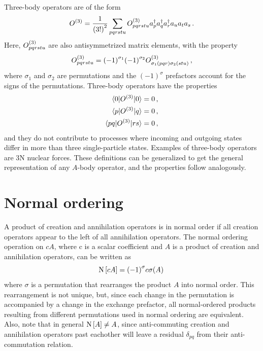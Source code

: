 Three-body operators are of the form
\begin{equation}\label{eq:threebody_op_definition}
  {O}^{(3)} = \frac{1}{{(3!)}^2} \sum_{pqrstu} {O}^{(3)}_{pqrstu} a_{p}^{\dagger} a_{q}^{\dagger} a_{r}^{\dagger} a_{u} a_{t} a_{s}\,.
\end{equation}
Here, ${O}^{(3)}_{pqrstu}$ are also antisymmetrized matrix elements, with the property
\begin{equation}
  {O}^{(3)}_{pqrstu} = {(-1)}^{\sigma_1}{(-1)}^{\sigma_2}{O}^{(3)}_{\sigma_1(pqr)\sigma_2(stu)}\,,
\end{equation}
where $\sigma_1$ and $\sigma_2$ are permutations
and the ${(-1)}^{\sigma}$ prefactors account for the signs of the permutations.
Three-body operators have the properties
\begin{align}
  \braket{0 | {O}^{(3)} | 0} & = 0\,,\\
  \braket{p | {O}^{(3)} | q} & = 0\,, \\
  \braket{p q| {O}^{(3)} |r s} & = 0\,,
\end{align}
and they do not contribute to processes where incoming and outgoing states
differ in more than three single-particle states.
Examples of three-body operators are 3N nuclear forces.
These definitions can be generalized to get the general representation of any $A$-body operator,
and the properties follow analogously.

\section{Normal ordering}

A product of creation and annihilation operators is in normal order
if all creation operators appear to the left of all annihilation operators.
The normal ordering operation on $c A$,
where c is a scalar coefficient and $A$ is a product of creation and annihilation operators,
can be written as
\begin{equation}
  \text{N}\left[c A\right] = {(-1)}^{\sigma} c \sigma(A)\,
\end{equation}
where $\sigma$ is a permutation that rearranges the product $A$ into normal order.
This rearrangement is not unique,
but, since each change in the permutation is accompanied by a change in the exchange prefactor,
all normal-ordered products resulting from different permutations used in normal ordering
are equivalent.
Also, note that in general $\text{N}\left[A\right] \neq A$,
since anti-commuting creation and annihilation operators past eachother
will leave a residual $\delta_{pq}$ from their anti-commutation relation.

